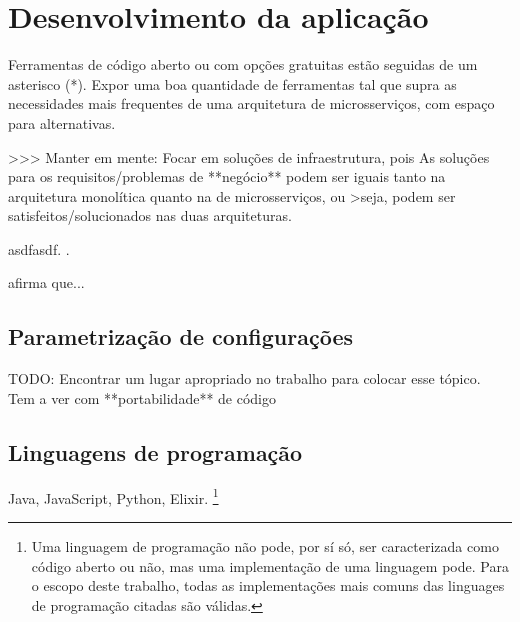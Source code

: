 \chapter{Desenvolvimento da aplicação}\label{chapter-ferramentas}



Ferramentas de código aberto ou com opções gratuitas estão seguidas de um asterisco (*).
Expor uma boa quantidade de ferramentas tal que supra as necessidades mais frequentes de uma arquitetura de microsserviços, com espaço para alternativas.

>>> Manter em mente: Focar em soluções de infraestrutura, pois As soluções para os requisitos/problemas de **negócio** podem ser iguais tanto na arquitetura monolítica quanto na de microsserviços, ou >seja, podem ser satisfeitos/solucionados nas duas arquiteturas.

asdfasdf. \cite{Tanembaum-Steen}.

 afirma que...

\section{Parametrização de configurações}
TODO: Encontrar um lugar apropriado no trabalho para colocar esse tópico. Tem a ver com **portabilidade** de código

\section{Linguagens de programação}
Java, JavaScript, Python, Elixir. \footnote{Uma linguagem de programação não pode, por sí só, ser caracterizada como código aberto ou não, mas uma implementação de uma linguagem pode. Para o escopo deste trabalho, todas as implementações mais comuns das linguages de programação citadas são válidas.}

